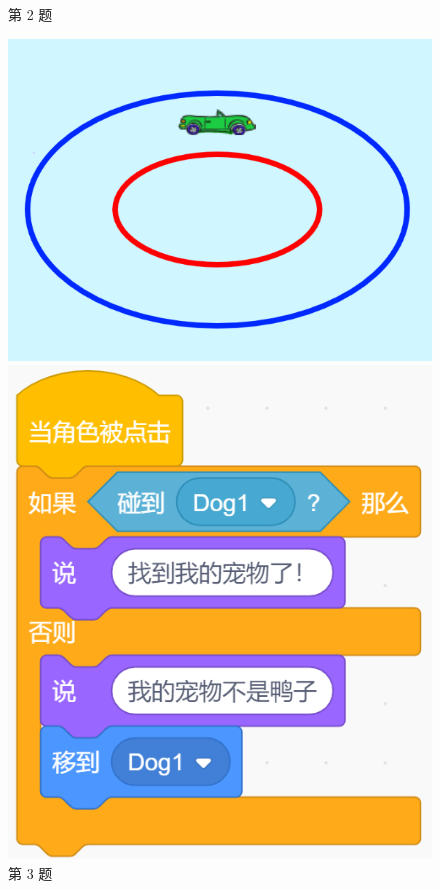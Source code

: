\documentclass[10pt, a4paper]{article}
\begin{document}
\begin{enumerate}
\begin{figure}[htbp]
\begin{minipage}[t]{.35\textwidth}
\begin{minipage}[t]{.53\textwidth}
                \end{minipage}
                \caption*{第 2 题}
            \end{minipage}
            \begin{minipage}[t]{.25\textwidth}
                \centering
                \includegraphics[width=\textwidth]{3.png}
                \caption*{第 3 题}
            \end{minipage}
            \begin{minipage}[t]{.35\textwidth}
                \centering
                \begin{minipage}[t]{.45\textwidth}
                    \includegraphics[width=\textwidth]{5-1.png}

\end{minipage}
\end{minipage}
\end{figure}
\end{enumerate}
\end{document}
